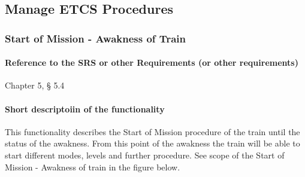 \subsection{Manage ETCS Procedures}

\subsubsection{Start of Mission - Awakness of Train}%
\paragraph{Reference to the SRS or other Requirements (or other requirements)}
Chapter 5, § 5.4
\paragraph{Short descriptoiin of the functionality}
This functionality describes the Start of Mission procedure of the train until the status of the awakness. From this point of the awakness the train will be able to start different modes, levels and further procedure.
See scope of the Start of Mission - Awakness of train in the figure below.


